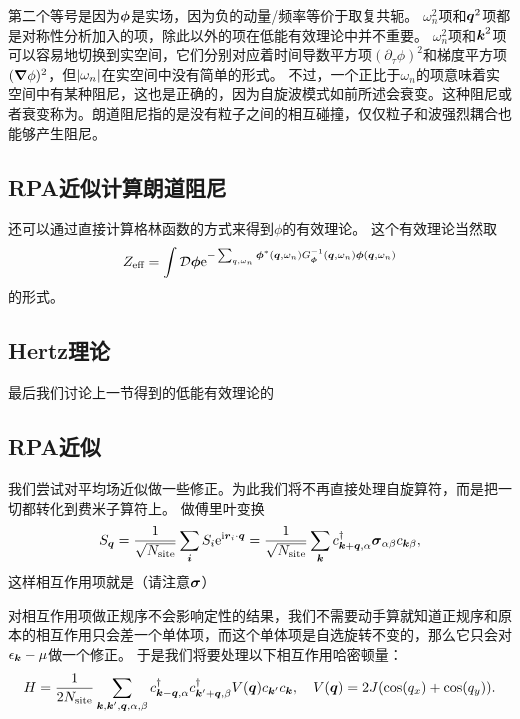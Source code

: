 第二个等号是因为$\vb*{\phi}$是实场，因为负的动量/频率等价于取复共轭。
$\omega_n^2$项和$\vb*{q}^2$项都是对称性分析加入的项，除此以外的项在低能有效理论中并不重要。%
$\omega_n^2$项和$\vb*{k}^2$项可以容易地切换到实空间，它们分别对应着时间导数平方项$(\partial_\tau \phi)^2$和梯度平方项$(\grad{\phi})^2$，但$\abs{\omega_n}$在实空间中没有简单的形式。
不过，一个正比于$\omega_n$的项意味着实空间中有某种阻尼，这也是正确的，因为自旋波模式如前所述会衰变。这种阻尼或者衰变称为。朗道阻尼指的是没有粒子之间的相互碰撞，仅仅粒子和波强烈耦合也能够产生阻尼。

\subsection{RPA近似计算朗道阻尼}

还可以通过直接计算格林函数的方式来得到$\phi$的有效理论。
这个有效理论当然取
\[
    Z_\text{eff} = \int \mathcal{D}\vb*{\phi} \mathrm{e}^{- \sum_{q, \omega_n} \vb*{\phi}^*(\vb*{q}, \omega_n) G^{-1}_{\vb*{\phi}}(\vb*{q}, \omega_n) \vb*{\phi}(\vb*{q}, \omega_n)}
\]
的形式。

\subsection{Hertz理论}

最后我们讨论上一节得到的低能有效理论的

\subsection{RPA近似}

我们尝试对平均场近似做一些修正。为此我们将不再直接处理自旋算符，而是把一切都转化到费米子算符上。
做傅里叶变换
\[
    {S}_{\vb*{q}} = \frac{1}{\sqrt{N_\text{site}}} \sum_{\vb*{i}} {S}_i \mathrm{e}^{\mathrm{i} \vb*{r}_i \cdot \vb*{q}} = \frac{1}{\sqrt{N_\text{site}}} \sum_{\vb*{k}} {c}^\dagger_{\vb*{k}+\vb*{q}, \alpha} \vb*{\sigma}_{\alpha \beta} {c}_{\vb*{k} \beta},
\]
这样相互作用项就是（请注意$\vb*{\sigma}$）

对相互作用项做正规序不会影响定性的结果，我们不需要动手算就知道正规序和原本的相互作用只会差一个单体项，而这个单体项是自选旋转不变的，那么它只会对$\epsilon_{\vb*{k}} - \mu$做一个修正。
于是我们将要处理以下相互作用哈密顿量：%
\begin{equation}
    {H} = \frac{1}{2 N_\text{site}} \sum_{\vb*{k}, \vb*{k}', \vb*{q}, \alpha, \beta} {c}^\dagger_{\vb*{k}-\vb*{q}, \alpha} {c}^\dagger_{\vb*{k}'+\vb*{q}, \beta} V(\vb*{q}) {c}_{\vb*{k}'} {c}_{\vb*{k}}, \quad V(\vb*{q}) = 2 J (\cos(q_x) + \cos(q_y)).
\end{equation}

